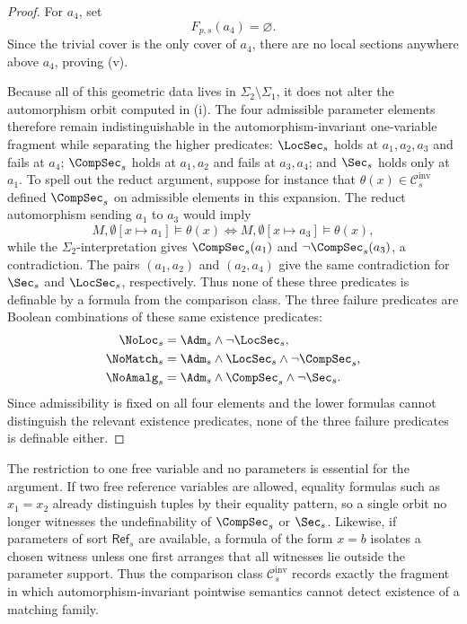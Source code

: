 \begin{proof}
For $a_4$, set
\[
F_{p,s}(a_4)=\varnothing.
\]
Since the trivial cover is the only cover of $a_4$, there are no local sections anywhere above $a_4$, proving \textup{(v)}.

Because all of this geometric data lives in $\Sigma_2\setminus\Sigma_1$, it does not alter the automorphism orbit computed in \textup{(i)}. The four admissible parameter elements therefore remain indistinguishable in the automorphism-invariant one-variable fragment while separating the higher predicates: $\LocSec_s$ holds at $a_1,a_2,a_3$ and fails at $a_4$; $\CompSec_s$ holds at $a_1,a_2$ and fails at $a_3,a_4$; and $\Sec_s$ holds only at $a_1$.
To spell out the reduct argument, suppose for instance that $\theta(x)\in\mathcal C_s^{\mathrm{inv}}$ defined $\CompSec_s$ on admissible elements in this expansion. The reduct automorphism sending $a_1$ to $a_3$ would imply
\[
M,\emptyset[x\mapsto a_1]\models\theta(x)
\Longleftrightarrow
M,\emptyset[x\mapsto a_3]\models\theta(x),
\]
while the $\Sigma_2$-interpretation gives $\CompSec_s(a_1)$ and $\neg\CompSec_s(a_3)$, a contradiction. The pairs $(a_1,a_2)$ and $(a_2,a_4)$ give the same contradiction for $\Sec_s$ and $\LocSec_s$, respectively. Thus none of these three predicates is definable by a formula from the comparison class.
The three failure predicates are Boolean combinations of these same existence predicates:
\begin{align*}
\NoLoc_s&=\Adm_s\land \neg\LocSec_s,\\
\NoMatch_s&=\Adm_s\land \LocSec_s\land \neg\CompSec_s,\\
\NoAmalg_s&=\Adm_s\land \CompSec_s\land \neg\Sec_s.
\end{align*}
Since admissibility is fixed on all four elements and the lower formulas cannot distinguish the relevant existence predicates, none of the three failure predicates is definable either.
\end{proof}

\begin{remark}\label{rem:tuple-parameter-limitation}
The restriction to one free variable and no parameters is essential for the argument. If two free reference variables are allowed, equality formulas such as $x_1=x_2$ already distinguish tuples by their equality pattern, so a single orbit no longer witnesses the undefinability of $\CompSec_s$ or $\Sec_s$. Likewise, if parameters of sort $\mathsf{Ref}_s$ are available, a formula of the form $x=b$ isolates a chosen witness unless one first arranges that all witnesses lie outside the parameter support. Thus the comparison class $\mathcal{C}_{s}^{\mathrm{inv}}$ records exactly the fragment in which automorphism-invariant pointwise semantics cannot detect existence of a matching family.
\end{remark}
